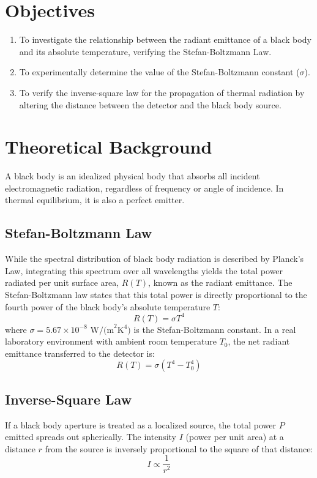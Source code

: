 \documentclass[a4paper,11pt]{article}
\begin{document}
\section{Objectives}
\begin{enumerate}
    \item To investigate the relationship between the radiant emittance of a black body and its absolute temperature, verifying the Stefan-Boltzmann Law.
    \item To experimentally determine the value of the Stefan-Boltzmann constant ($\sigma$).
    \item To verify the inverse-square law for the propagation of thermal radiation by altering the distance between the detector and the black body source.
\end{enumerate}

\section{Theoretical Background}
A black body is an idealized physical body that absorbs all incident electromagnetic radiation, regardless of frequency or angle of incidence. In thermal equilibrium, it is also a perfect emitter.

\subsection{Stefan-Boltzmann Law}
While the spectral distribution of black body radiation is described by Planck's Law, integrating this spectrum over all wavelengths yields the total power radiated per unit surface area, $R(T)$, known as the radiant emittance. The Stefan-Boltzmann law states that this total power is directly proportional to the fourth power of the black body's absolute temperature $T$:
\begin{equation}
    R(T) = \sigma T^4
\end{equation}
where $\sigma = 5.67 \times 10^{-8} \text{ W/(m}^2\text{K}^4)$ is the Stefan-Boltzmann constant. In a real laboratory environment with ambient room temperature $T_0$, the net radiant emittance transferred to the detector is:
\begin{equation} \label{eq:stefan}
    R(T) = \sigma (T^4 - T_0^4)
\end{equation}

\subsection{Inverse-Square Law}
If a black body aperture is treated as a localized source, the total power $P$ emitted spreads out spherically. The intensity $I$ (power per unit area) at a distance $r$ from the source is inversely proportional to the square of that distance:
\begin{equation} \label{eq:invsq}
    I \propto \frac{1}{r^2}
\end{equation}
\end{document}
